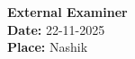 
\vspace*{2.5\baselineskip} %

\begin{flushleft}

\textbf{External Examiner}\\
\vspace*{2.5\baselineskip}
\textbf{Date: }22-11-2025\\
\textbf{Place: }Nashik
\end{flushleft}

\vspace*{1.5\baselineskip}






